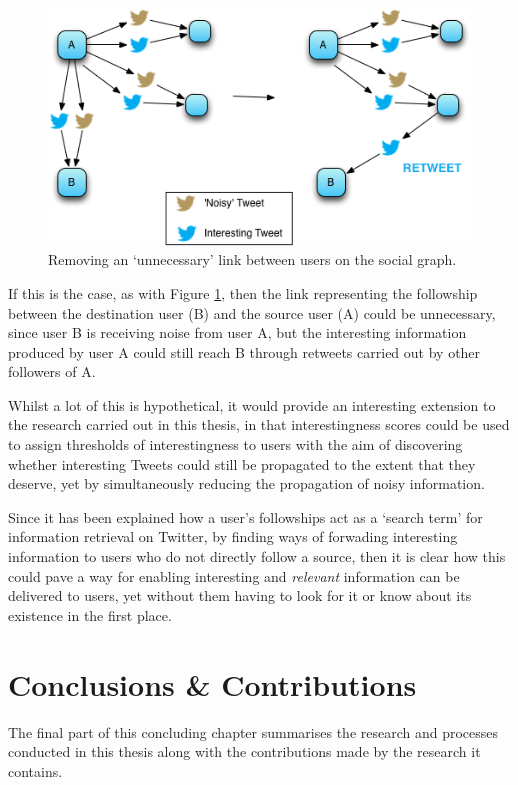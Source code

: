 \begin{figure}[h]
\centering
\includegraphics[scale=0.8]{6.Conclusions/Media/retweet_path.png} 
\caption{Removing an `unnecessary' link between users on the social graph.}
\label{fig:removed_link}
\end{figure}

If this is the case, as with Figure \ref{fig:removed_link}, then the link representing the followship between the destination user (B) and the source user (A) could be unnecessary, since user B is receiving noise from user A, but the interesting information produced by user A could still reach B through retweets carried out by other followers of A. 

Whilst a lot of this is hypothetical, it would provide an interesting extension to the research carried out in this thesis, in that interestingness scores could be used to assign thresholds of interestingness to users with the aim of discovering whether interesting Tweets could still be propagated to the extent that they deserve, yet by simultaneously reducing the propagation of noisy information. 

Since it has been explained how a user's followships act as a `search term' for information retrieval on Twitter, by finding ways of forwading interesting information to users who do not directly follow a source, then it is clear how this could pave a way for enabling interesting and \textit{relevant} information can be delivered to users, yet without them having to look for it or know about its existence in the first place.


\section{Conclusions \& Contributions}
The final part of this concluding chapter summarises the research and processes conducted in this thesis along with the contributions made by the research it contains.


